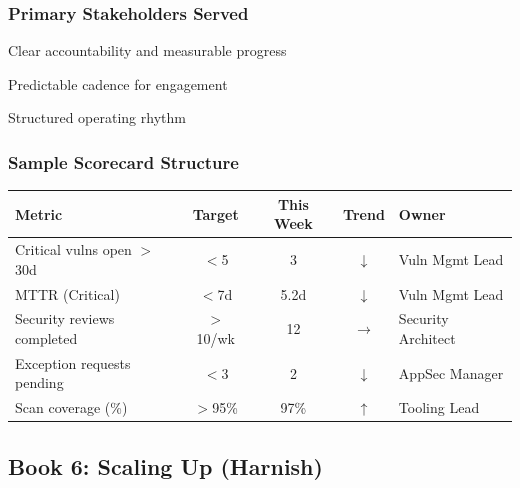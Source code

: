 \documentclass[11pt,letterpaper]{article}
\begin{document}
\subsubsection{Primary Stakeholders Served}

\begin{stakeholderbox}
\begin{description}[nosep, leftmargin=2.5cm]
    \item[Executives] Clear accountability and measurable progress
    \item[Eng Leadership] Predictable cadence for engagement
    \item[AppSec Manager] Structured operating rhythm
\end{description}
\end{stakeholderbox}

\subsubsection{Sample Scorecard Structure}

\begin{center}
\renewcommand{\arraystretch}{1.3}
\footnotesize
\begin{tabular}{p{4cm}cccl}
\toprule
\textbf{Metric} & \textbf{Target} & \textbf{This Week} & \textbf{Trend} & \textbf{Owner} \\
\midrule
Critical vulns open $>$30d & $<$5 & 3 & $\downarrow$ & Vuln Mgmt Lead \\
MTTR (Critical) & $<$7d & 5.2d & $\downarrow$ & Vuln Mgmt Lead \\
Security reviews completed & $>$10/wk & 12 & $\rightarrow$ & Security Architect \\
Exception requests pending & $<$3 & 2 & $\downarrow$ & AppSec Manager \\
Scan coverage (\%) & $>$95\% & 97\% & $\uparrow$ & Tooling Lead \\
\bottomrule
\end{tabular}
\end{center}

\newpage

\subsection{Book 6: Scaling Up (Harnish)}
\end{document}
